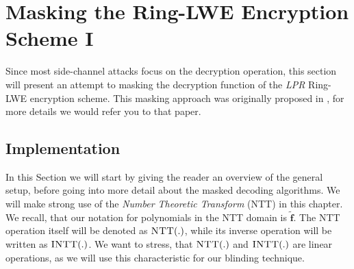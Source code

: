 %
%

\chapter{Masking the Ring-LWE Encryption Scheme I}
Since most side-channel attacks focus on the decryption operation, this section will present an attempt to masking the decryption function of the \textit{LPR} Ring-LWE encryption scheme. This masking approach was originally proposed in \cite{maskedRing}, for more details we would refer you to that paper.

\section{Implementation}
In this Section we will start by giving the reader an overview of the general setup, before going into more detail about the masked decoding algorithms. We will make strong use of the \textit{Number Theoretic Transform} (NTT) in this chapter. We recall, that our notation for polynomials in the NTT domain is \(\tilde{\textbf{f}}\). The NTT operation itself will be denoted as \(\textsc{NTT}(.)\), while its inverse operation will be written as \(\textsc{INTT}(.)\). We want to stress, that \(\textsc{NTT}(.)\) and \(\textsc{INTT}(.)\) are linear operations, as we will use this characteristic for our blinding technique.

